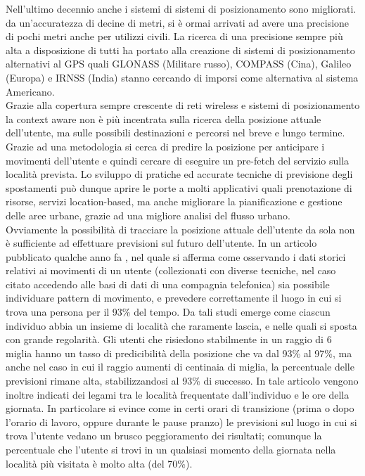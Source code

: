 Nell'ultimo decennio anche i sistemi di sistemi di posizionamento sono migliorati.
da un'accuratezza di decine di metri, si \`e ormai arrivati ad avere una precisione
di pochi metri anche per utilizzi civili. La ricerca di una precisione sempre
pi\`u alta a disposizione di tutti ha portato alla creazione di sistemi di posizionamento
alternativi al GPS quali GLONASS (Militare russo), COMPASS (Cina), Galileo (Europa) e IRNSS (India)
stanno cercando di imporsi come alternativa al sistema Americano.\\
Grazie alla copertura sempre crescente di reti wireless e sistemi di posizionamento la
context aware non \`e pi\`u incentrata sulla ricerca della posizione attuale dell'utente, ma sulle possibili destinazioni
e percorsi nel breve e lungo termine. Grazie ad una metodologia si cerca di predire la posizione
per anticipare i movimenti dell'utente e quindi cercare di eseguire un pre-fetch
del servizio sulla localit\`a prevista.
Lo sviluppo di pratiche ed accurate tecniche di previsione degli spostamenti
pu\`o dunque aprire le porte a molti applicativi quali prenotazione di risorse,
servizi location-based, ma anche migliorare la pianificazione e gestione delle
aree urbane, grazie ad una migliore analisi del flusso urbano.\\
Ovviamente la possibilit\`a di tracciare la posizione attuale dell'utente da sola non \`e sufficiente
ad effettuare previsioni sul futuro dell'utente. In un articolo pubblicato qualche anno fa
 \cite{new_1}, nel quale si afferma come osservando i dati storici relativi ai movimenti di un utente
(collezionati con diverse tecniche, nel caso citato accedendo alle basi di dati di una compagnia telefonica)
sia possibile individuare pattern di movimento, e prevedere correttamente il luogo in cui
si trova una persona per il 93\% del tempo. Da tali studi emerge come ciascun
individuo abbia un insieme di localit\`a che raramente lascia, e nelle quali si
sposta con grande regolarit\`a. Gli utenti che risiedono stabilmente in un raggio
di 6 miglia hanno un tasso di predicibilit\`a della posizione che va dal 93\% al
97\%, ma anche nel caso in cui il raggio aumenti di centinaia di miglia, la
percentuale delle previsioni rimane alta, stabilizzandosi al 93\% di successo.
In tale articolo vengono inoltre indicati dei legami tra le localit\`a frequentate
dall'individuo e le ore della giornata. In particolare si evince come in
certi orari di transizione (prima o dopo l'orario di lavoro, oppure durante le
pause pranzo) le previsioni sul luogo in cui si trova l'utente vedano un brusco
peggioramento dei risultati; comunque la percentuale che l'utente si trovi in
un qualsiasi momento della giornata nella localit\`a pi\`u visitata \`e molto alta (del
70\%).

